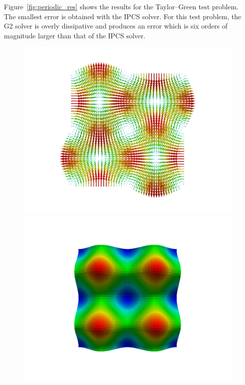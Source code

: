 Figure~\ref{fig:periodic_res} shows the results for the Taylor--Green
test problem. The smallest error is obtained with the IPCS solver. For
this test problem, the G2 solver is overly dissipative and produces an
error which is six orders of magnitude larger than that of the IPCS
solver.

\begin{figure}
\bwfig
  {\includegraphics[width=\twofigsfull]{chapters/kvs-1/pdf/periodic_v.pdf}
   \includegraphics[width=\twofigsfull]{chapters/kvs-1/pdf/periodic_p.pdf}}
\end{figure}

